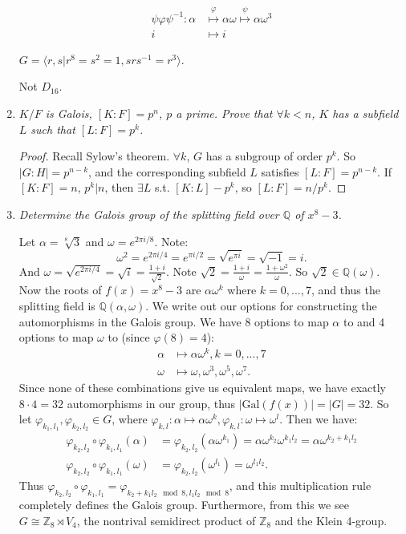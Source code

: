 \documentclass[9pt,reqno,twoside]{amsbook}
\theoremstyle{plain}
\numberwithin{section}{chapter}
\numberwithin{equation}{chapter}
\theoremstyle{definition}
\theoremstyle{remark}
\theoremstyle{plain}
\newcommand{\semi}{\rtimes}
\newcommand{\z}{\mathbb{Z}}
\newcommand{\Q}{\mathbb{Q}}
\newcommand{\bb}{\vspace{3mm}}
\newcommand{\bee}{\begin{equation}\begin{aligned}}
\newcommand{\eee}{\end{aligned}\end{equation}}
\newcommand{\fracc}{\frac}
\newcommand{\counter}{\setcounter}
\newcommand{\gal}{\mathrm{Gal}}
\renewcommand{\phi}{\varphi}
\begin{document}
\begin{enumerate}[label=\arabic*.]
\bee
\psi\phi\psi^{-1} : \alpha &\overset{\phi}{\mapsto}\alpha\omega \overset{\psi}{\mapsto} \alpha \omega^3\\
i &\mapsto i
\eee

$G = \langle r,s|r^8 = s^2 = 1,srs^{-1} = r^3\rangle$. 

Not $D_{16}$. 



	
\item \textit{$K/F$ is Galois, $[K:F] = p^n$, $p$ a prime. Prove that $\forall k < n$, $K$ has a subfield $L$ such that $[L:F] = p^k$. }

\begin{proof}
Recall Sylow's theorem. $\forall k$, $G$ has a subgroup of order $p^k$. So $|G:H| = p^{n - k}$, and the corresponding subfield $L$ satisfies $[L:F] = p^{n - k}$. If $[K:F] = n$, $p^k|n$, then $\exists L$ s.t. $[K:L] - p^k$, so $[L:F] = n/p^k$. 
\end{proof}

\bb

\counter{enumi}{9}

\item \textit{Determine the Galois group of the splitting field over $\Q$ of $x^8 - 3$. }

\bb

Let $\alpha = \sqrt[8]{3}$ and $\omega = e^{2\pi i/8}$. Note:
$$
\omega^2 = e^{2\pi i/4} = e^{\pi i/2} = \sqrt{e^{\pi i}} = \sqrt{-1} = i.
$$
And $\omega = \sqrt{e^{2\pi i / 4}} =\sqrt{i} = \fracc{1 + i}{\sqrt{2}}$.  Note $\sqrt{2} = \fracc{1 + i}{\omega} = \fracc{1 + \omega^2}{\omega}$. So $\sqrt{2} \in \Q(\omega)$. Now the roots of $f(x) = x^8 - 3$ are $\alpha\omega^k$ where $k = 0,...,7$, and thus the splitting field is $\Q(\alpha,\omega)$. We write out our options for constructing the automorphisms in the Galois group. We have 8 options to map $\alpha$ to and 4 options to map $\omega$ to (since $\phi(8) = 4$):
\bee
\alpha &\mapsto \alpha\omega^k, k = 0,...,7\\
\omega & \mapsto \omega,\omega^3,\omega^5,\omega^7.
\eee
Since none of these combinations give us equivalent maps, we have exactly $8\cdot 4 = 32$ automorphisms in our group, thus $|\gal(f(x))| = |G| = 32$. So let $\phi_{k_1,l_1},\phi_{k_2,l_2} \in G$, where $\phi_{k,l}:\alpha \mapsto \alpha\omega^k,\phi_{k,l}:\omega \mapsto \omega^l$. Then we have:
\bee
\phi_{k_2,l_2}\circ\phi_{k_1,l_1}(\alpha) &= \phi_{k_2,l_2}(\alpha\omega^{k_1}) = \alpha\omega^{k_2}\omega^{k_1l_2} = \alpha\omega^{k_2 + k_1l_2}\\
\phi_{k_2,l_2}\circ\phi_{k_1,l_1}(\omega) &= \phi_{k_2,l_2}(\omega^{l_1}) = \omega^{l_1l_2}.
\eee
Thus $\phi_{k_2,l_2}\circ\phi_{k_1,l_1} = \phi_{k_2 + k_1l_2 \mod 8,l_1l_2\mod 8}$, and this multiplication rule completely defines the Galois group. Furthermore, from this we see $G \cong \z_8 \semi V_4$, the nontrival semidirect product of $\z_8$ and the Klein 4-group. 


\end{enumerate}
\end{document}
